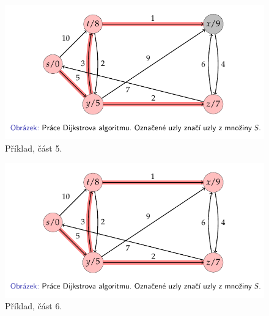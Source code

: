 \begin{figure}[H]
    \centering
    \includegraphics[width=0.80\linewidth]{example_dijkstra_p5.pdf}
    \caption{Příklad, část 5.}
\end{figure}

\begin{figure}[H]
    \centering
    \includegraphics[width=0.80\linewidth]{example_dijkstra_p6.pdf}
    \caption{Příklad, část 6.}
\end{figure}
